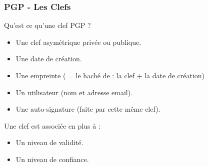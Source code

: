 \begin{frame}
    \frametitle{\color{white}PGP - Les Clefs}
    \begin{block}{Qu'est ce qu'une clef PGP ?}
    	\begin{itemize}
	  \item Une clef asymétrique privée ou publique.
	  \item Une date de création.
	  \item Une empreinte ( = le haché de : la clef + la date de création)
	  \item Un utilisateur (nom et adresse email).
	  \item Une auto-signature (faite par cette même clef).
       \end{itemize} 
    \end{block}
    \begin{block}{Une clef est associée en plus à :}
      \begin{itemize}
        \item Un niveau de validité.
	\item Un niveau de confiance.
      \end{itemize}
    \end{block}

\end{frame}

